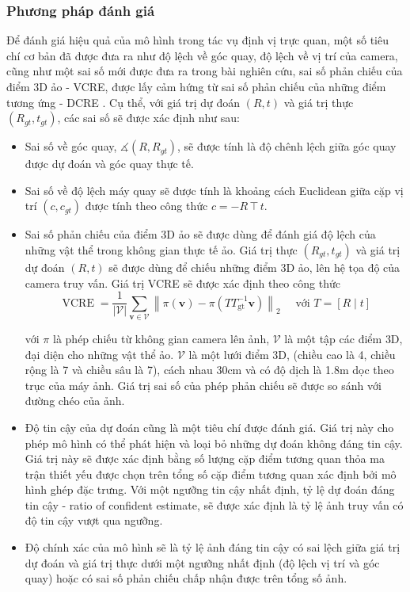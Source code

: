 \subsubsection{Phương pháp đánh giá}
Để đánh giá hiệu quả của mô hình trong tác vụ định vị trực quan, một số tiêu chí cơ bản đã được đưa ra như độ lệch về góc quay, độ lệch về vị trí của camera, cũng như một sai số mới được đưa ra trong bài nghiên cứu, sai số phản chiếu của điểm 3D ảo - VCRE, được lấy cảm hứng từ sai số phản chiếu của những điểm tương ứng - DCRE \cite{wald2020beyond}. Cụ thể, với giá trị dự đoán $(R,t)$ và giá trị thực $(R_{gt},t_{gt})$, các sai số sẽ được xác định như sau:
\begin{itemize}
  \item Sai số về góc quay, $\measuredangle(R,R_{gt})$, sẽ được tính là độ chênh lệch giữa góc quay được dự đoán và góc quay thực tế.
  \item Sai số về độ lệch máy quay sẽ được tính là khoảng cách Euclidean giữa cặp vị trí $(c,c_{gt})$ được tính theo công thức $c=-R \intercal t$.
  \item Sai số phản chiếu của điểm 3D ảo sẽ được dùng để đánh giá độ lệch của những vật thể trong không gian thực tế ảo. Giá trị thực $(R_{gt},t_{gt})$ và giá trị dự đoán $(R,t)$ sẽ được dùng để chiếu những điểm 3D ảo, lên hệ tọa độ của camera truy vấn. Giá trị VCRE sẽ được xác định theo công thức
        $$
          \operatorname{VCRE}=\frac{1}{|\mathcal{V}|} \sum_{\mathbf{v} \in \mathcal{V}}\left\|\pi(\mathbf{v})-\pi\left(T T_{\mathrm{gt}}^{-1} \mathbf{v}\right)\right\|_2 \quad \text { với } T=[R \mid t]
        $$

        với $\pi$ là phép chiếu từ không gian camera lên ảnh, $\mathcal{V}$ là một tập các điểm 3D, đại diện cho những vật thể ảo. $\mathcal{V}$ là một lưới điểm 3D, (chiều cao là 4, chiều rộng là 7 và chiều sâu là 7), cách nhau 30cm và có độ dịch là 1.8m dọc theo trục của máy ảnh. Giá trị sai số của phép phản chiếu sẽ được so sánh với đường chéo của ảnh.
  \item Độ tin cậy của dự đoán cũng là một tiêu chí được đánh giá. Giá trị này cho phép mô hình có thể phát hiện và loại bỏ những dự đoán không đáng tin cậy. Giá trị này sẽ được xác định bằng số lượng cặp điểm tương quan thỏa ma trận thiết yếu được chọn trên tổng số cặp điểm tương quan xác định bởi mô hình ghép đặc trưng. Với một ngưỡng tin cậy nhất định, tỷ lệ dự đoán đáng tin cậy - ratio of confident estimate, sẽ được xác định là tỷ lệ ảnh truy vấn có độ tin cậy vượt qua ngưỡng.
  \item Độ chính xác của mô hình sẽ là tỷ lệ ảnh đáng tin cậy có sai lệch giữa giá trị dự đoán và giá trị thực dưới một ngưỡng nhất định (độ lệch vị trí và góc quay) hoặc có sai số phản chiếu chấp nhận được trên tổng số ảnh.
\end{itemize}

